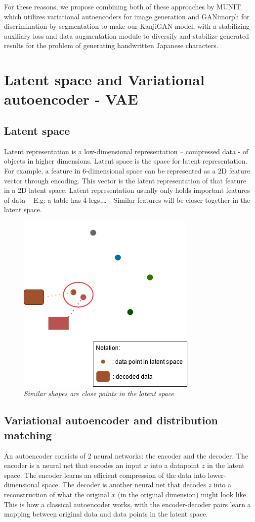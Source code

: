 \documentclass[12pt]{report}
\begin{document}
For these reasons, we propose combining both of these approaches by MUNIT\cite{munit} which utilizes variational autoencoders for image generation and GANimorph\cite{ganimorph} for discrimination by segmentation to make our KanjiGAN model, with a stabilizing auxiliary loss and data augmentation module to diversify and stabilize generated results for the problem of generating handwritten Japanese characters.

\section{Latent space and Variational autoencoder - VAE}
\subsection{Latent space}
Latent representation is a low-dimensional representation – compressed data - of objects in higher dimensions. Latent space is the space for latent representation. For example, a feature in 6-dimensional space can be represented as a 2D feature vector through encoding. This vector is the latent representation of that feature in a 2D latent space.
Latent representation usually only holds important features of data – E.g: a table has 4 legs,… - Similar features will be closer together in the latent space.
\begin{figure}[H]
	\centering
	\includegraphics[scale=0.9]{latent-space}
	\caption{\textit{Similar shapes are close points in the latent space}}
	\label{fig:latent-space}
\end{figure}

\subsection{Variational autoencoder and distribution matching}
An autoencoder consists of 2 neural networks: the encoder and the decoder.
The encoder is a neural net that encodes an input $x$ into a datapoint $z$ in the latent space. The encoder learns an efficient compression of the data into lower-dimensional space.
The decoder is another neural net that decodes $z$ into a reconstruction of what the original $x$ (in the original dimension) might look like.
This is how a classical autoencoder works, with the encoder-decoder pairs learn a mapping between original data and data points in the latent space.
\end{document}
